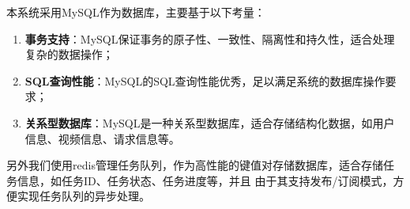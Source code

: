 本系统采用MySQL作为数据库，主要基于以下考量：
\begin{enumerate}
    \item \textbf{事务支持}：MySQL保证事务的原子性、一致性、隔离性和持久性，适合处理复杂的数据操作；
    \item \textbf{SQL查询性能}：MySQL的SQL查询性能优秀，足以满足系统的数据库操作要求；
    \item \textbf{关系型数据库}：MySQL是一种关系型数据库，适合存储结构化数据，如用户信息、视频信息、请求信息等。
\end{enumerate}

另外我们使用redis管理任务队列，作为高性能的键值对存储数据库，适合存储任务信息，如任务ID、任务状态、任务进度等，并且
由于其支持发布/订阅模式，方便实现任务队列的异步处理。